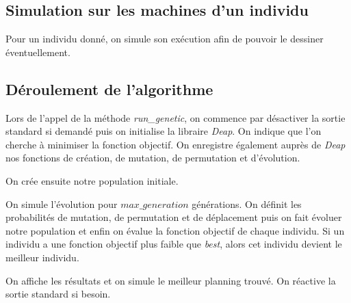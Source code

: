 \subsection{Simulation sur les machines d'un individu}



Pour un individu donné, on simule son exécution afin de pouvoir le dessiner éventuellement.

\newpage

\subsection{Déroulement de l'algorithme}



Lors de l'appel de la méthode \textit{run\_genetic}, on commence par désactiver la sortie standard si demandé puis on initialise la libraire \textit{Deap}. On indique que l'on cherche à minimiser la fonction objectif. On enregistre également auprès de \textit{Deap} nos fonctions de création, de mutation, de permutation et d'évolution.



On crée ensuite notre population initiale.



On simule l'évolution pour $max\_generation$ générations. On définit les probabilités de mutation, de permutation et de déplacement puis on fait évoluer notre population et enfin on évalue la fonction objectif de chaque individu. Si un individu a une fonction objectif plus faible que \textit{best}, alors cet individu devient le meilleur individu. 



On affiche les résultats et on simule le meilleur planning trouvé. On réactive la sortie standard si besoin.